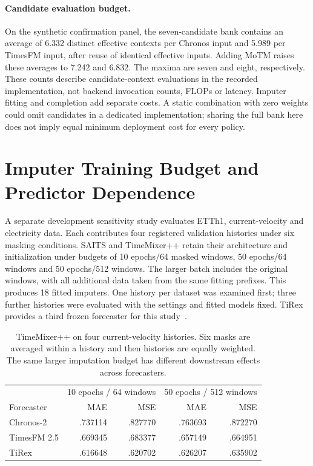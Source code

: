 \documentclass{article}
\begin{document}


\paragraph{Candidate evaluation budget.}
On the synthetic confirmation panel, the seven-candidate bank contains an average of 6.332 distinct effective contexts per Chronos input and 5.989 per TimesFM input, after reuse of identical effective inputs. Adding MoTM raises these averages to 7.242 and 6.832. The maxima are seven and eight, respectively. These counts describe candidate-context evaluations in the recorded implementation, not backend invocation counts, FLOPs or latency. Imputer fitting and completion add separate costs. A static combination with zero weights could omit candidates in a dedicated implementation; sharing the full bank here does not imply equal minimum deployment cost for every policy.



\section{Imputer Training Budget and Predictor Dependence}
\label{sec:budget}

A separate development sensitivity study evaluates ETTh1, current-velocity and electricity data. Each contributes four registered validation histories under six masking conditions. SAITS and TimeMixer++ retain their architecture and initialization under budgets of 10 epochs/64 masked windows, 50 epochs/64 windows and 50 epochs/512 windows. The larger batch includes the original windows, with all additional data taken from the same fitting prefixes. This produces 18 fitted imputers. One history per dataset was examined first; three further histories were evaluated with the settings and fitted models fixed. TiRex provides a third frozen forecaster for this study~\citep{auer2025tirex}.

\begin{table}[t]
\caption{TimeMixer++ on four current-velocity histories. Six masks are averaged within a history and then histories are equally weighted. The same larger imputation budget has different downstream effects across forecasters.}
\label{tab:budget-origins}
\centering\small
\begin{tabular}{lrrrr}
\toprule
 & \multicolumn{2}{c}{10 epochs / 64 windows} & \multicolumn{2}{c}{50 epochs / 512 windows}\\
Forecaster & MAE & MSE & MAE & MSE\\
\midrule
Chronos-2 & .737114 & .827770 & .763693 & .872270\\
TimesFM 2.5 & .669345 & .683377 & .657149 & .664951\\
TiRex & .616648 & .620702 & .626207 & .635902\\
\bottomrule
\end{tabular}
\end{table}
\end{document}
